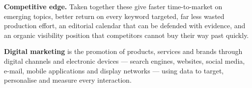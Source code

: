 \begin{qlist}
\textbf{Competitive edge.} Taken together these give faster time-to-market on
emerging topics, better return on every keyword targeted, far less wasted
production effort, an editorial calendar that can be defended with evidence,
and an organic visibility position that competitors cannot buy their way past
quickly.

\textbf{Digital marketing} is the promotion of products, services and brands
through digital channels and electronic devices --- search engines, websites,
social media, e-mail, mobile applications and display networks --- using data
to target, personalise and measure every interaction.


\end{qlist}
